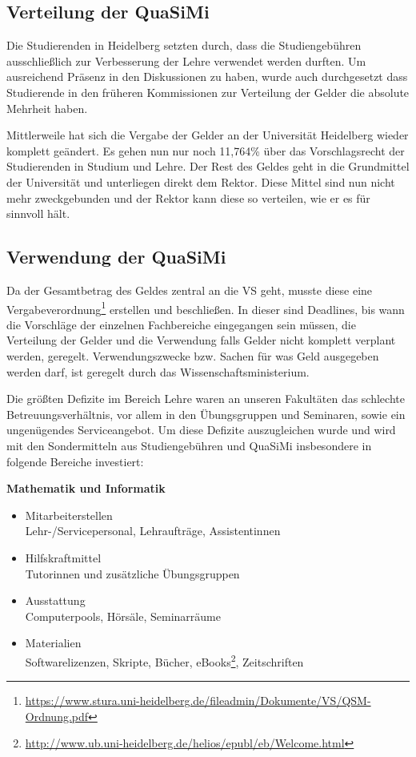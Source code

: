 \subsection{Verteilung der QuaSiMi}
Die Studierenden in Heidelberg setzten durch, dass die Studiengebühren ausschließlich zur Verbesserung der Lehre verwendet werden durften. Um ausreichend Präsenz in den Diskussionen zu haben, wurde auch durchgesetzt dass Studierende in den früheren Kommissionen zur Verteilung der Gelder die absolute Mehrheit haben. 

Mittlerweile hat sich die Vergabe der Gelder an der Universität Heidelberg wieder komplett geändert. Es gehen nun nur noch 11,764\% über das Vorschlagsrecht der Studierenden in Studium und Lehre. Der Rest des Geldes geht in die Grundmittel der Universität und unterliegen direkt dem Rektor. Diese Mittel sind nun nicht mehr zweckgebunden und der Rektor kann diese so verteilen, wie er es für sinnvoll hält. 


\subsection{Verwendung der QuaSiMi}
Da der Gesamtbetrag des Geldes zentral an die VS geht, musste diese eine Vergabeverordnung\footnote{\url{https://www.stura.uni-heidelberg.de/fileadmin/Dokumente/VS/QSM-Ordnung.pdf}} erstellen und beschließen. In dieser sind Deadlines, bis wann die Vorschläge der einzelnen Fachbereiche eingegangen sein müssen, die Verteilung der Gelder und die Verwendung falls Gelder nicht komplett verplant werden, geregelt. Verwendungszwecke bzw. Sachen für was Geld ausgegeben werden darf, ist geregelt durch das Wissenschaftsministerium.

Die größten Defizite im Bereich Lehre waren an unseren Fakultäten das schlechte Betreuungsverhältnis, vor allem in den Übungsgruppen und Seminaren, sowie ein ungenügendes Serviceangebot. Um diese Defizite auszugleichen wurde und wird mit den Sondermitteln aus Studiengebühren und QuaSiMi insbesondere in folgende Bereiche investiert:

\vspace{5mm}
\textbf{Mathematik und Informatik}
\begin{itemize}
 \item {Mitarbeiterstellen}\\Lehr-/Servicepersonal, Lehraufträge, Assistentinnen
\item {Hilfskraftmittel}\\ Tutorinnen und zusätzliche Übungsgruppen
\item {Ausstattung}\\ Computerpools, Hörsäle, Seminarräume
\item {Materialien}\\ Softwarelizenzen, Skripte, Bücher, eBooks\footnote{\url{http://www.ub.uni-heidelberg.de/helios/epubl/eb/Welcome.html}}, Zeitschriften
\end{itemize}

